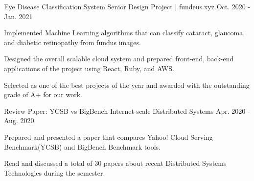 
\begin{cventries}

  \cvopenentry
   {Eye Disease Classification System} %
    {Senior Design Project | fundeus.xyz} %
    {} %
    {Oct. 2020 - Jan. 2021} %
    {
      \begin{cvitems} %
      	\item {Implemented Machine Learning algorithms that can classify cataract, glaucoma, and diabetic retinopathy from fundus images.}
      	\item {Designed the overall scalable cloud system and prepared front-end, back-end applications of the project using React, Ruby, and AWS.}
        \item {Selected as one of the best projects of the year and awarded with the outstanding grade of A+ for our work.}
      \end{cvitems}
    }
\cvopenentry
   {Review Paper: YCSB vs BigBench} %
    {Internet-scale Distributed Systems} %
    {} %
    {Apr. 2020 - Aug. 2020} %
    {
      \begin{cvitems} %
        \item {Prepared and presented a paper that compares Yahoo! Cloud Serving Benchmark(YCSB) and         BigBench Benchmark tools.}
      	\item {Read and discussed a total of 30 papers about recent Distributed Systems Technologies during the semester.}

\end{cvitems}}
\end{cventries}
